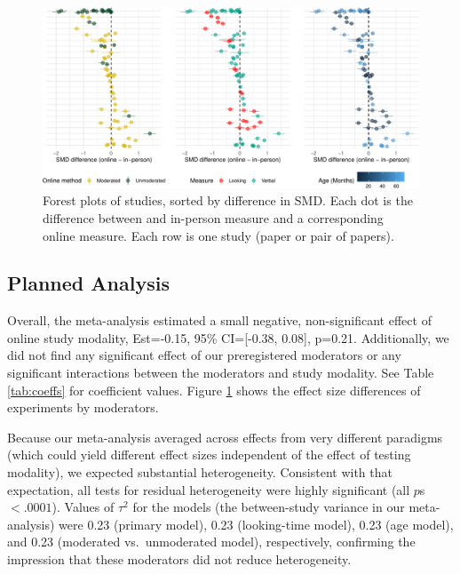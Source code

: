 \documentclass[
  man,floatsintext]{apa6}
\begin{document}
\begin{figure}[h]

{\centering \includegraphics[width=1\linewidth]{OnlineMA_main_files/figure-latex/forest-1} 

}

\caption{Forest plots of studies, sorted by difference in SMD. Each dot is the difference between and in-person measure and a corresponding online measure. Each row is one study (paper or pair of papers).}\label{fig:forest}
\end{figure}

\hypertarget{planned-analysis}{%
\subsection{Planned Analysis}\label{planned-analysis}}

Overall, the meta-analysis estimated a small negative, non-significant effect of online study modality, Est=-0.15, 95\% CI={[}-0.38, 0.08{]}, p=0.21. Additionally, we did not find any significant effect of our preregistered moderators or any significant interactions between the moderators and study modality. See Table \ref{tab:coeffs} for coefficient values. Figure \ref{fig:forest} shows the effect size differences of experiments by moderators.

Because our meta-analysis averaged across effects from very different paradigms (which could yield different effect sizes independent of the effect of testing modality), we expected substantial heterogeneity. Consistent with that expectation, all tests for residual heterogeneity were highly significant (all \(p\)s \(< .0001\)). Values of \(\tau^2\) for the models (the between-study variance in our meta-analysis) were 0.23 (primary model), 0.23 (looking-time model), 0.23 (age model), and 0.23 (moderated vs.~unmoderated model), respectively, confirming the impression that these moderators did not reduce heterogeneity.
\end{document}
